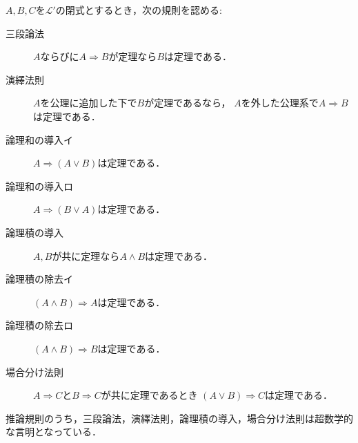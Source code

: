 	\begin{screen}
		\begin{logicalaxm}[基本的な推論規則]\label{logicalaxm:fundamental_rules_of_inference}
			$A,B,C$を$\mathcal{L}'$の閉式とするとき，次の規則を認める:
			\begin{description}
				\item[三段論法] $A$ならびに$A \Longrightarrow B$が定理なら$B$は定理である．
				\item[演繹法則] $A$を公理に追加した下で$B$が定理であるなら，
					$A$を外した公理系で$A \Longrightarrow B$は定理である．
				\item[論理和の導入イ] $A \Longrightarrow (A \vee B)$は定理である．
				\item[論理和の導入ロ] $A \Longrightarrow (B \vee A)$は定理である．
				\item[論理積の導入] $A,B$が共に定理なら$A \wedge B$は定理である．
				\item[論理積の除去イ] $(A \wedge B) \Longrightarrow A$は定理である．
				\item[論理積の除去ロ] $(A \wedge B) \Longrightarrow B$は定理である．
				\item[場合分け法則] $A \Longrightarrow C$と$B \Longrightarrow C$が共に定理であるとき
					$(A \vee B) \Longrightarrow C$は定理である．
			\end{description}	
		\end{logicalaxm}
	\end{screen}
	
	推論規則のうち，三段論法，演繹法則，論理積の導入，場合分け法則は超数学的な言明となっている．
	
	

